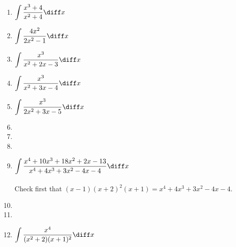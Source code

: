 
\begin{multicols}{2}
\begin{enumerate}[ref={\fcProblemRef}]
\item $\displaystyle  \int \frac{x^3+4}{x^2+4}\diff x$

\item $\displaystyle\int \frac{4x^2 }{2x^2-1}\diff x$

\item $\displaystyle\int \frac{x^3}{x^2+2x-3}\diff x$

\item $\displaystyle\int \frac{x^3}{x^2+3x-4}\diff x$

\item $\displaystyle\int \frac{x^3 }{2x^2+3x-5}\diff x$ 

\item 
\item 
\item 
\item $\displaystyle \int \frac {x^{4}+10x^{3}+ 18x^{2} +2x - 13}{x^{4} +4x^{3} +3x^{2}- 4x-4} \diff x$ 
\\~\\

Check first that $(x-1)(x+2)^2(x+1)= x^{4}+4x^{3}+3x^{2}-4x-4$. 

\item 
\item 
\item \label{problemIntegral x^4/((x^2+2)(x+1)^2)} $\displaystyle\int \frac{x^4}{(x^2+2)(x+1)^2} \diff x $


\end{enumerate}
\end{multicols}
